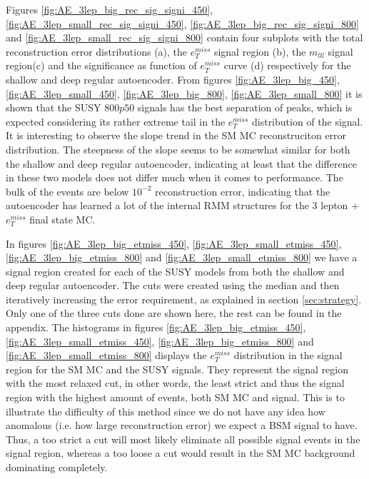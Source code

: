 Figures \ref{fig:AE_3lep_big_rec_sig_signi_450}, \ref{fig:AE_3lep_small_rec_sig_signi_450}, 
\ref{fig:AE_3lep_big_rec_sig_signi_800} and \ref{fig:AE_3lep_small_rec_sig_signi_800} contain four 
subplots with the total reconstruction error distributions (a), the $e_T^{miss}$ signal region (b), 
the $m_{lll}$ signal region(c) and the significance as function of $e_T^{miss}$ curve (d) respectively 
for the shallow and deep regular autoencoder. From figures \ref{fig:AE_3lep_big_450}, 
\ref{fig:AE_3lep_small_450}, \ref{fig:AE_3lep_big_800}, \ref{fig:AE_3lep_small_800} it is shown that the 
SUSY $800p50$ signals has the best separation of peaks, which is expected considering its 
rather extreme tail in the $e_T^{miss}$ distribution of the signal. It is interesting to 
observe the slope trend in the SM MC reconstruciton error distribution. The steepness of the 
slope seems to be somewhat similar for both the shallow and deep regular autoencoder, indicating 
at least that the difference in these two models does not differ much when it comes to performance. 
The bulk of the events are below $10^{-2}$ reconstruction error, indicating that the autoencoder 
has learned a lot of the internal RMM structures for the 3 lepton + $e_T^{miss}$ final state MC. \par
In figures \ref{fig:AE_3lep_big_etmiss_450}, \ref{fig:AE_3lep_small_etmiss_450}, 
\ref{fig:AE_3lep_big_etmiss_800} and  \ref{fig:AE_3lep_small_etmiss_800} we have a signal region 
created for each of the SUSY models from both the shallow and deep regular autoencoder. The cuts 
were created using the median and then iteratively increasing the error requirement, as 
explained in section \ref{sec:strategy}. Only one of the three cuts done are shown here, the 
rest can be found in the appendix. The histograms in figures \ref{fig:AE_3lep_big_etmiss_450}, 
\ref{fig:AE_3lep_small_etmiss_450}, \ref{fig:AE_3lep_big_etmiss_800} and  
\ref{fig:AE_3lep_small_etmiss_800} displays the $e_T^{miss}$ distribution in the signal region 
for the SM MC and the SUSY signals. They represent the signal region with the most relaxed cut, 
in other words, the least strict and thus the signal region with the highest amount of events, 
both SM MC and signal. This is to illustrate the difficulty of this method since we do not have 
any idea how anomalous (i.e. how large reconstruction error) we expect a BSM signal to have. 
Thus, a too strict a cut will most likely eliminate all possible 
signal events in the signal region, whereas a too loose a cut would result in the SM MC background dominating completely.

